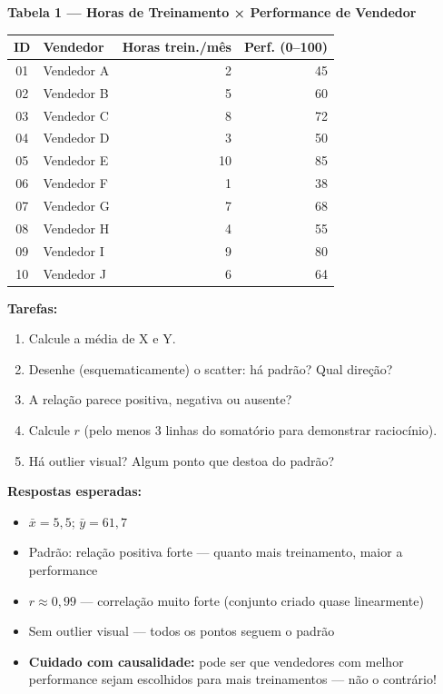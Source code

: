 \begin{BoardBox}
\textbf{Tabela 1 — Horas de Treinamento × Performance de Vendedor}

\medskip
\begin{tabular}{|c|l|r|r|}
\hline
\textbf{ID} & \textbf{Vendedor} & \textbf{Horas trein./mês} & \textbf{Perf. (0–100)} \\
\hline
01 & Vendedor A & 2  & 45 \\
02 & Vendedor B & 5  & 60 \\
03 & Vendedor C & 8  & 72 \\
04 & Vendedor D & 3  & 50 \\
05 & Vendedor E & 10 & 85 \\
06 & Vendedor F & 1  & 38 \\
07 & Vendedor G & 7  & 68 \\
08 & Vendedor H & 4  & 55 \\
09 & Vendedor I & 9  & 80 \\
10 & Vendedor J & 6  & 64 \\
\hline
\end{tabular}

\medskip
\textbf{Tarefas:}
\begin{enumerate}
  \item Calcule a média de X e Y.
  \item Desenhe (esquematicamente) o scatter: há padrão? Qual direção?
  \item A relação parece positiva, negativa ou ausente?
  \item Calcule $r$ (pelo menos 3 linhas do somatório para demonstrar raciocínio).
  \item Há outlier visual? Algum ponto que destoa do padrão?
\end{enumerate}

\textbf{Respostas esperadas:}
\begin{itemize}
  \item $\bar{x} = 5{,}5$; $\bar{y} = 61{,}7$
  \item Padrão: relação positiva forte — quanto mais treinamento, maior a performance
  \item $r \approx 0{,}99$ — correlação muito forte (conjunto criado quase linearmente)
  \item Sem outlier visual — todos os pontos seguem o padrão
  \item \textbf{Cuidado com causalidade:} pode ser que vendedores com melhor performance
  sejam escolhidos para mais treinamentos — não o contrário!
\end{itemize}
\end{BoardBox}

